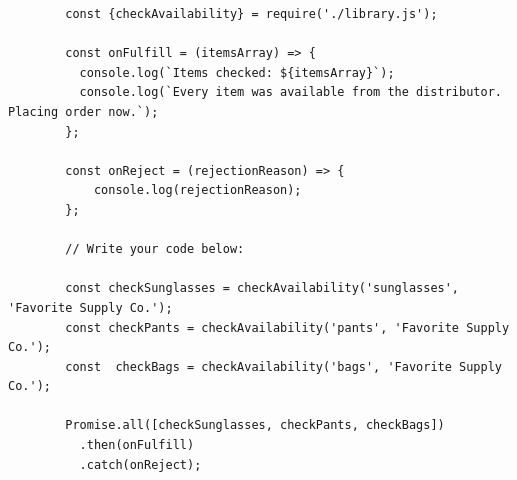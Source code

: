 \documentclass[12pt]{article}
\begin{document}
\begin{itemize}
\begin{itemize}
    \end{itemize}

    \begin{lstlisting}
        const {checkAvailability} = require('./library.js');

        const onFulfill = (itemsArray) => {
          console.log(`Items checked: ${itemsArray}`);
          console.log(`Every item was available from the distributor. Placing order now.`);
        };

        const onReject = (rejectionReason) => {
            console.log(rejectionReason);
        };

        // Write your code below:

        const checkSunglasses = checkAvailability('sunglasses', 'Favorite Supply Co.');
        const checkPants = checkAvailability('pants', 'Favorite Supply Co.');
        const  checkBags = checkAvailability('bags', 'Favorite Supply Co.');

        Promise.all([checkSunglasses, checkPants, checkBags])
          .then(onFulfill)
          .catch(onReject);
    \end{lstlisting}


\end{itemize}
\end{document}
